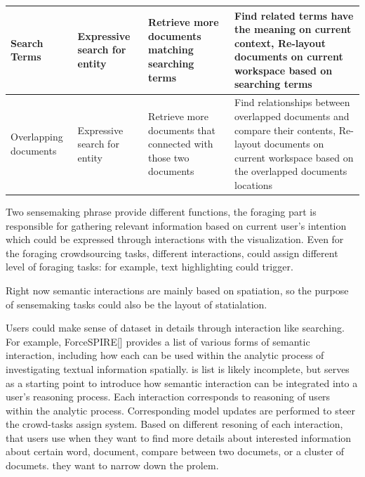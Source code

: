 \documentclass[journal]{vgtc}                %
\begin{document}
\begin{table}[t]
\begin{tabular}{| m{2cm} | m{6cm} | m{4cm} | m{4cm} |}
Search Terms & Expressive search for entity & Retrieve more documents matching searching terms & Find related terms have the meaning on current context, Re-layout documents on current workspace based on searching terms \\ \hline


Overlapping documents
& Expressive search for entity & Retrieve more documents that connected with those two documents & Find relationships between overlapped documents and compare their contents, Re-layout documents on current workspace based on the overlapped documents locations\\ \hline
\end{tabular}
\end{table}

Two sensemaking phrase provide different functions, the foraging part is responsible for gathering relevant information based on current user's intention which could be expressed through interactions with the visualization. Even for the foraging crowdsourcing tasks, different interactions, could assign different level of foraging tasks: for example, text highlighting could trigger.


Right now semantic interactions are mainly based on spatiation, so the purpose of sensemaking tasks could also be the layout of statialation.

Users could make sense of dataset in details through interaction like searching.
For example, ForceSPIRE[] provides a list of various forms of semantic interaction, including how each can be used within the analytic process of investigating textual information spatially.
is list is likely incomplete, but serves as a starting point to introduce how semantic interaction can be integrated into a user’s reasoning process.
Each interaction corresponds to reasoning of users within the analytic process.
Corresponding model updates are performed to steer the crowd-tasks assign system.
Based on different resoning of each interaction, that users use when they want to find more details about interested information about certain word, document, compare between two documets, or a cluster of documets.
they want to narrow down the prolem.
\end{document}
